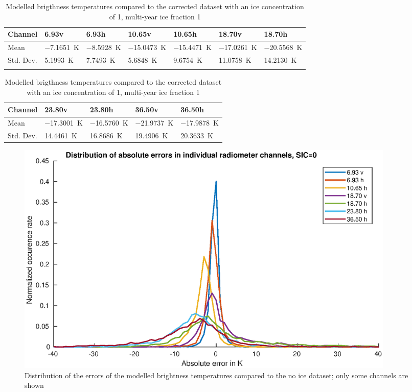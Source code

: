 \documentclass[11pt, a4paper]{article}
\begin{document}
\begin{table}[h!]
\centering
\begin{tabular}{@{} l l l l l l l @{}}
Channel & 6.93v & 6.93h & 10.65v & 10.65h & 18.70v & 18.70h \\
\midrule
Mean & \SI{-7.1651}{K} & \SI{-8.5928}{K} & \SI{-15.0473}{K} & \SI{-15.4471}{K} & \SI{-17.0261}{K} & \SI{-20.5568}{K} \\
Std. Dev. & \SI{5.1993}{K} & \SI{7.7493}{K} & \SI{5.6848}{K} & \SI{9.6754}{K} & \SI{11.0758}{K} & \SI{14.2130}{K} \\
\midrule
\tabularnewline
\end{tabular}
\begin{tabular}{@{} l l l l l @{}}
Channel & 23.80v & 23.80h & 36.50v & 36.50h \\
\midrule
Mean & \SI{-17.3001}{K} & \SI{-16.5760}{K} & \SI{-21.9737}{K} & \SI{-17.9878}{K} \\
Std. Dev. & \SI{14.4461}{K} & \SI{16.8686}{K} & \SI{19.4906}{K} & \SI{20.3633}{K}  \\
\midrule
\end{tabular}
\caption{Modelled brigthness temperatures compared to the corrected dataset with an ice concentration of 1, multi-year ice fraction 1}
\label{tab:for1_1}
\end{table}


\begin{figure}[h!]
   \centering
   \includegraphics[width=0.9\textwidth]{ValidationForward_SIC0_errordist.eps}
   \caption{Distribution of the errors of the modelled brightness temperatures compared to the no ice dataset; only some channels are shown}
   \label{fig:for0dist}
\end{figure}
\end{document}
